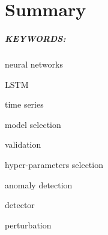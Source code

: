 %

\chapter*{Summary}\label{ch:summary}

\paragraph{KEYWORDS:}
\begin{itemize*}[label=,itemsep=1em,itemjoin=\hspace{1em}]
  \item neural networks
  \item LSTM
  \item time series
  \item model selection
  \item validation
  \item hyper-parameters selection
  \item anomaly detection
  \item detector
  \item perturbation
\end{itemize*}

\endinput
